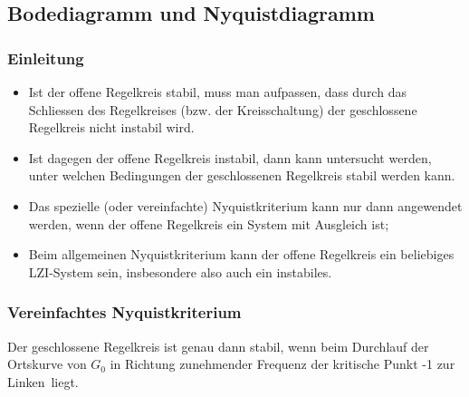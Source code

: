 \subsection{Bodediagramm  und Nyquistdiagramm   }
\subsubsection{Einleitung}
\begin{itemize}
	\item Ist der offene Regelkreis stabil, muss man aufpassen, dass durch das Schliessen
	des Regelkreises (bzw. der Kreisschaltung) der geschlossene Regelkreis nicht instabil
	wird.
	\item Ist dagegen der offene Regelkreis instabil, dann kann untersucht werden, unter
	welchen Bedingungen der geschlossenen Regelkreis stabil werden kann.
	\item Das
	spezielle (oder vereinfachte) Nyquistkriterium kann nur dann angewendet werden,
	wenn der offene Regelkreis ein System mit Ausgleich ist;
	\item Beim allgemeinen Nyquistkriterium
	kann der offene Regelkreis ein beliebiges LZI-System sein, insbesondere also auch
	ein instabiles.
\end{itemize}
\subsubsection{Vereinfachtes Nyquistkriterium }
		Der geschlossene Regelkreis ist genau dann stabil, wenn beim Durchlauf der
		Ortskurve von $G_0$ in Richtung zunehmender Frequenz der kritische Punkt -1 \glqq zur
		Linken\grqq\ liegt.

